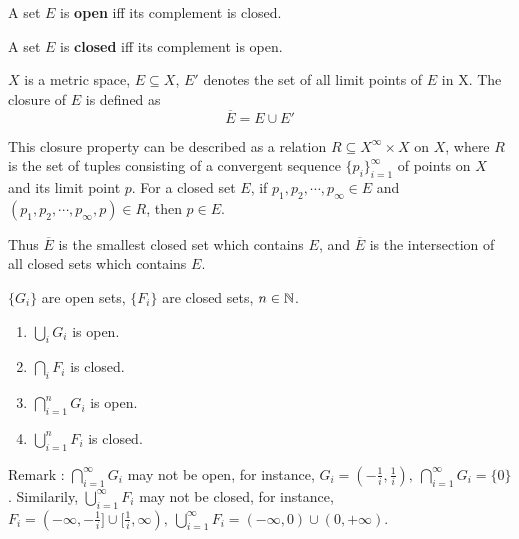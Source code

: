     \begin{theo}
        A set $E$ is \textbf{open} iff its complement is closed.
    \end{theo}
    \begin{theo}
        A set $E$ is \textbf{closed} iff its complement is open.
    \end{theo}

    \begin{defi}
        $X$ is a metric space, $E \subseteq X$, $E'$ denotes the set of all limit points of $E$ in X. The closure of $E$ is defined as
        \begin{equation}
            \overline{E} = E \cup E'
        \end{equation}
    \end{defi}

    This closure property can be described as a relation $R \subseteq X^{\infty} \times X$ on $X$, where $R$ is the set of tuples consisting of a convergent sequence $\{p_i\}_{i=1}^{\infty}$ of points on $X$ and its limit point $p$. For a closed set $E$, if $p_1, p_2, \cdots, p_{\infty} \in E$ and $(p_1, p_2, \cdots, p_{\infty}, p) \in R$, then $p \in E$. 
    
    Thus $\overline{E}$ is the smallest closed set which contains $E$, and $\overline{E}$ is the intersection of all closed sets which contains $E$.

    \begin{theo}
        $\{G_i\}$ are open sets, $\{F_i\}$ are closed sets, $n \in \mathbb{N}$.
        \begin{enumerate}
            \item $\bigcup_{i} G_i$ is open.
            \item $\bigcap_{i} F_i$ is closed.
            \item $\bigcap_{i=1}^n G_i$ is open.
            \item $\bigcup_{i=1}^n F_i$ is closed.
        \end{enumerate}
        Remark : $\bigcap_{i=1}^{\infty} G_i$ may not be open, for instance, $G_i = (-\frac{1}{i}, \frac{1}{i}), \ \bigcap_{i=1}^{\infty} G_i = \{0\}$. Similarily, $\bigcup_{i=1}^\infty F_i$ may not be closed, for instance, $F_i = (-\infty, -\frac{1}{i}]\cup [\frac{1}{i}, \infty), \ \bigcup_{i=1}^{\infty} F_i = (-\infty, 0) \cup (0, +\infty)$.
    \end{theo}

